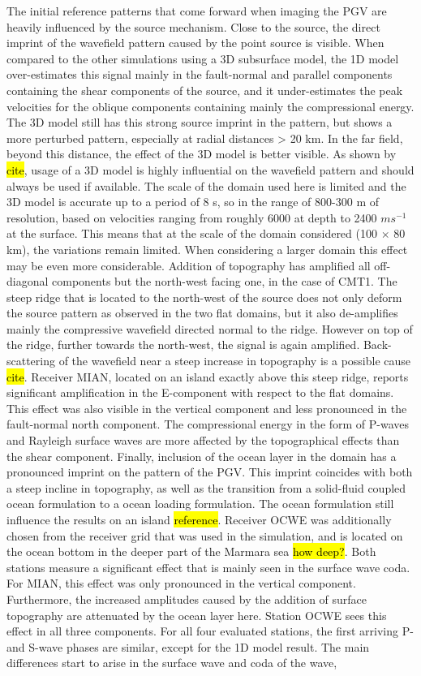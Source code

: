 \documentclass[../00main.tex]{subfiles}
\begin{document}
The initial reference patterns that come forward when imaging the PGV are heavily influenced by the source mechanism. Close to the source, the direct imprint of the wavefield pattern caused by the point source is visible. When compared to the other simulations using a 3D subsurface model, the 1D model over-estimates this signal mainly in the fault-normal and parallel components containing the shear components of the source, and it under-estimates the peak velocities for the oblique components containing mainly the compressional energy. The 3D model still has this strong source imprint in the pattern, but shows a more perturbed pattern, especially at radial distances > 20 km. In the far field, beyond this distance, the effect of the 3D model is better visible. As shown by \hl{cite}, usage of a 3D model is highly influential on the wavefield pattern and should always be used if available. The scale of the domain used here is limited and the 3D model is accurate up to a period of 8 s, so in the range of 800-300 m of resolution, based on velocities ranging from roughly 6000 at depth to 2400 $ms^{-1}$ at the surface. This means that at the scale of the domain considered (100 $\times$ 80 km), the variations remain limited. When considering a larger domain this effect may be even more considerable. Addition of topography has amplified all off-diagonal components but the north-west facing one, in the case of CMT1. The steep ridge that is located to the north-west of the source does not only deform the source pattern as observed in the two flat domains, but it also de-amplifies mainly the compressive wavefield directed normal to the ridge. However on top of the ridge, further towards the north-west, the signal is again amplified. Back-scattering of the wavefield near a steep increase in topography is a possible cause \hl{cite}. Receiver MIAN, located on an island exactly above this steep ridge, reports significant amplification in the E-component with respect to the flat domains. This effect was also visible in the vertical component and less pronounced in the fault-normal north component. The compressional energy in the form of P-waves and Rayleigh surface waves are more affected by the topographical effects than the shear component. Finally, inclusion of the ocean layer in the domain has a pronounced imprint on the pattern of the PGV. This imprint coincides with both a steep incline in topography, as well as the transition from a solid-fluid coupled ocean formulation to a ocean loading formulation. The ocean formulation still influence the results on an island \hl{reference}. Receiver OCWE was additionally chosen from the receiver grid that was used in the simulation, and is located on the ocean bottom in the deeper part of the Marmara sea \hl{how deep?}. Both stations measure a significant effect that is mainly seen in the surface wave coda. For MIAN, this effect was only pronounced in the vertical component. Furthermore, the increased amplitudes caused by the addition of surface topography are attenuated by the ocean layer here. Station OCWE sees this effect in all three components. For all four evaluated stations, the first arriving P- and S-wave phases are similar, except for the 1D model result. The main differences start to arise in the surface wave and coda of the wave, 
\end{document}
